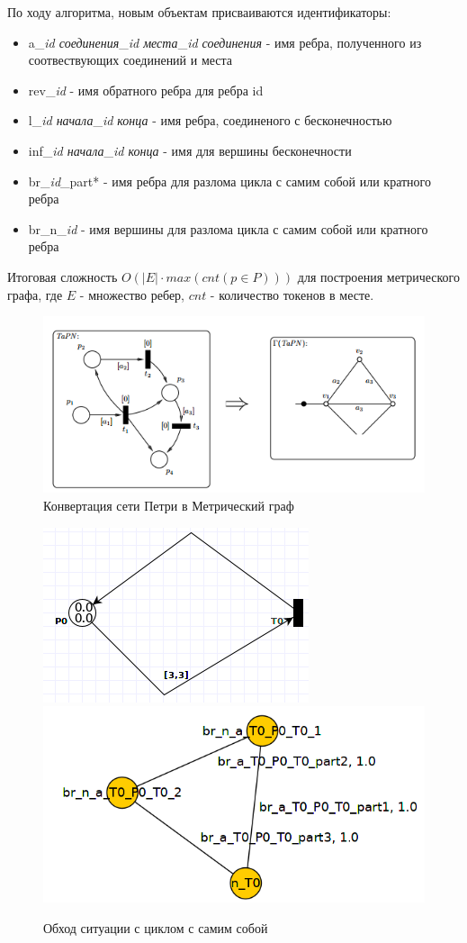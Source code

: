\documentclass{../TechDoc}
\begin{document}
	По ходу алгоритма, новым объектам присваиваются идентификаторы:
		\begin{itemize}
			\item a\_\textit{id соединения}\_\textit{id места}\_\textit{id соединения} - имя ребра, полученного из соотвествующих соединений и места
			\item rev\_\textit{id} - имя обратного ребра для ребра id
			\item l\_\textit{id начала}\_\textit{id конца} - имя ребра, соединеного с бесконечностью
			\item inf\_\textit{id начала}\_\textit{id конца} - имя для вершины бесконечности
			\item br\_\textit{id}\_part* - имя ребра для разлома цикла с самим собой или кратного ребра
			\item br\_n\_\textit{id} - имя вершины для разлома цикла с самим собой или кратного ребра
		\end{itemize}
	
	Итоговая сложность $O(|E| \cdot max(cnt(p \in P)))$ для построения метрического графа, где $E$ - множество ребер, $cnt$ - количество токенов в месте.
	
	\begin{figure}
		\centering
		\includegraphics[width=0.5\linewidth]{tapn_to_mg}
		\caption{Конвертация сети Петри в Метрический граф}
		\label{fig:tapntomg}
	\end{figure}
	\begin{figure}
		\centering
		\includegraphics[width=0.3\linewidth]{multi_edge}
		\includegraphics[width=0.3\linewidth]{multi_edge_res}
		\caption{Обход ситуации с циклом с самим собой}
		\label{fig:multiedgeres}
	\end{figure}
	
\end{document}
